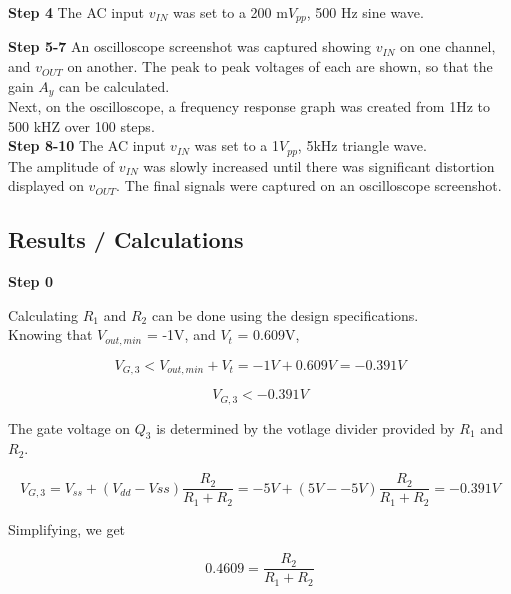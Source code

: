 \documentclass[notitlepage, 12pt]{report}  %
\begin{document}
\textbf{Step 4}
The AC input $v_{IN}$ was set to a 200 m$V_{pp}$, 500 Hz sine wave. \\

\newpage

\textbf{Step 5-7}
An oscilloscope screenshot was captured showing $v_{IN}$ on one channel, and $v_{OUT}$ on another. The peak to peak voltages of each are shown, 
so that the gain $A_y$ can be calculated.\\

Next, on the oscilloscope, a frequency response graph was created from 1Hz to 500 kHZ over 100 steps. \\

\textbf{Step 8-10}
The AC input $v_{IN}$ was set to a 1$V_{pp}$, 5kHz triangle wave. \\

The amplitude of $v_{IN}$ was slowly increased until there was significant distortion displayed on $v_{OUT}$. The final signals were captured 
on an oscilloscope screenshot. \\


\subsection*{Results / Calculations}

\textbf{Step 0}


Calculating $R_1$ and $R_2$ can be done using the design specifications. \\

Knowing that $V_{out, min}$ = -1V, and $V_t$ = 0.609V,

\begin{equation}
    V_{G,3} < V_{out, min} + V_t = -1V + 0.609V = -0.391V
\end{equation}

\begin{equation}
    V_{G,3} < -0.391V
\end{equation}

The gate voltage on $Q_3$ is determined by the votlage divider provided by $R_1$ and $R_2$. 

\begin{equation}
    V_{G,3} = V_{ss} + (V_{dd} - V{ss}) \frac{R_2}{R_1 + R_2} = -5V + (5V - -5V) \frac{R_2}{R_1 + R_2} = -0.391V
\end{equation}

Simplifying, we get 

\begin{equation}
    0.4609 = \frac{R_2}{R_1 + R_2}
\end{equation}
\end{document}

